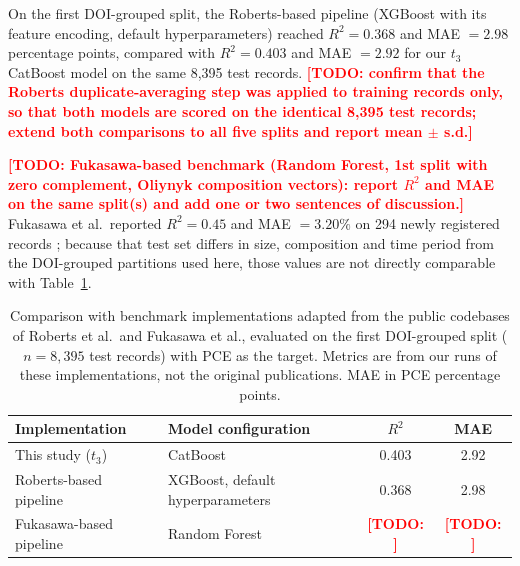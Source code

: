 \documentclass[3p]{elsarticle}
\newcommand{\authortodo}[1]{\textcolor{red}{\textbf{[TODO: #1]}}}
\begin{document}
On the first DOI-grouped split, the Roberts-based pipeline (XGBoost with its feature encoding, default hyperparameters) reached $R^2 = 0.368$ and MAE $= 2.98$ percentage points, compared with $R^2 = 0.403$ and MAE $= 2.92$ for our $t_3$ CatBoost model on the same 8,395 test records. \authortodo{confirm that the Roberts duplicate-averaging step was applied to training records only, so that both models are scored on the identical 8,395 test records; extend both comparisons to all five splits and report mean $\pm$ s.d.}

\authortodo{Fukasawa-based benchmark (Random Forest, 1st split with zero complement, Oliynyk composition vectors): report $R^2$ and MAE on the same split(s) and add one or two sentences of discussion.} Fukasawa et al.\ reported $R^2 = 0.45$ and MAE $= 3.20\%$ on 294 newly registered records \cite{fukasawa2024effectiveness}; because that test set differs in size, composition and time period from the DOI-grouped partitions used here, those values are not directly comparable with Table~\ref{tab:previous_pdp_studies}.

\begin{table}[t]
\centering
\small
\caption{Comparison with benchmark implementations adapted from the public codebases of Roberts et al.\ and Fukasawa et al., evaluated on the first DOI-grouped split ($n = 8{,}395$ test records) with PCE as the target. Metrics are from our runs of these implementations, not the original publications. MAE in PCE percentage points.}
\label{tab:previous_pdp_studies}
\begin{tabular}{llcc}
\toprule
Implementation & Model configuration & $R^2$ & MAE \\
\midrule
This study ($t_3$) & CatBoost & 0.403 & 2.92 \\
Roberts-based pipeline & XGBoost, default hyperparameters & 0.368 & 2.98 \\
Fukasawa-based pipeline & Random Forest & \authortodo{} & \authortodo{} \\
\bottomrule
\end{tabular}
\end{table}
\end{document}
